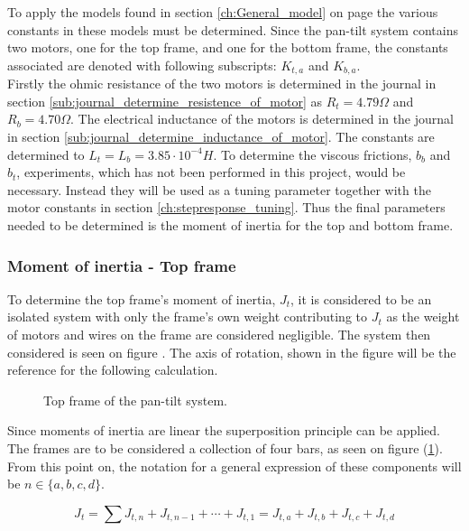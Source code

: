 \documentclass[../../main]{subfiles}
\begin{document}
To apply the models found in section \ref{ch:General_model} on page \pageref{ch:General_model} the various constants in these models must be determined. Since the pan-tilt system contains two motors, one for the top frame, and one for the bottom frame, the constants associated are denoted with following subscripts: $K_{t,a}$ and $K_{b,a}$. \\
Firstly the ohmic resistance of the two motors is determined in the journal in section \ref{sub:journal_determine_resistence_of_motor} as $R_t = 4.79 \si{\Omega}$ and $R_b = 4.70 \si{\Omega}$. The electrical inductance of the motors is determined in the journal in section \ref{sub:journal_determine_inductance_of_motor}. The constants are determined to $L_t = L_b = 3.85\cdot 10^{-4} \si{H}$.
To determine the viscous frictions, $b_b$ and $b_t$, experiments, which has not been performed in this project, would be necessary. Instead they will be used as a tuning parameter together with the motor constants in section \ref{ch:stepresponse_tuning}. Thus the final parameters needed to be determined is the moment of inertia for the top and bottom frame.

\subsubsection{Moment of inertia - Top frame}
\label{sec:Top_frame_inertia}
To determine the top frame's moment of inertia, $J_{t}$, it is considered to be an isolated system with only the frame's own weight contributing to $J_{t}$ as the weight of motors and wires on the frame are considered negligible. The system then considered is seen on figure . The axis of rotation, shown in the figure  will be the reference for the following calculation.\\

\begin{figure}[H]
  \centering
  
  \caption{Top frame of the pan-tilt system.}
  \label{fig:TopFrame}
\end{figure}

Since moments of inertia are linear the superposition principle can be applied. The frames are to be considered a collection of four bars, as seen on figure (\ref{fig:TopFrame}). From this point on, the notation for a general expression of these components will be $n \in \{a,b,c,d\}$.

\begin{equation}
  \label{eq:Top_frame_total_inertia_formula}
  J_t = \sum J_{t,n} + J_{t,n-1} + \dotsb + J_{t,1} = J_{t,a} + J_{t,b} + J_{t,c} + J_{t,d}
\end{equation}
\end{document}
